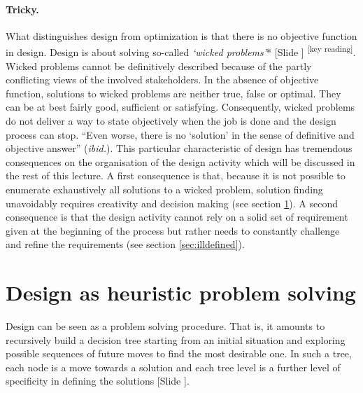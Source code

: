 \documentclass{article}
\newcounter{slide}
\begin{document}
\paragraph{Tricky.} What distinguishes design from optimization is that there is no objective function in design. Design is about solving so-called \emph{`wicked problems'}* {\color{blue}[Slide ]} \cite{rittelDilemmasGeneralTheory1973}\textsuperscript{\color{Magenta}[key reading]}. Wicked problems cannot be definitively described because of the partly conflicting views of the involved stakeholders. In the absence of objective function, solutions to wicked problems are neither true, false or optimal. They can be at best fairly good, sufficient or satisfying. Consequently, wicked problems do not deliver a way to state objectively when the job is done and the design process can stop. ``Even worse, there is no `solution' in the sense of definitive and objective answer'' (\emph{ibid.}). This particular characteristic of design has tremendous consequences on the organisation of the design activity which will be discussed in the rest of this lecture. A first consequence is that, because it is not possible to enumerate exhaustively all solutions to a wicked problem, solution finding unavoidably requires creativity {\color{red}{combine heuristics to find solutions}} and decision making {\color{red}{in the sense of arbitrarily cutting the unmanageable expansion of the decision tree and priorising a way to go}} (see section \ref{sec:GeneralProblemSolving}). A second consequence is that the design activity cannot rely on a solid set of requirement given at the beginning of the process but rather needs to constantly challenge and refine the requirements (see section \ref{sec:illdefined}). 

\section{Design as heuristic problem solving}
\label{sec:GeneralProblemSolving}
Design can be seen as a problem solving procedure. That is, it amounts to recursively build a decision tree starting from an initial situation and exploring possible sequences of future moves to find the most desirable one. In such a tree, each node is a move towards a solution and each tree level is a further level of specificity in defining the solutions {\color{blue}[Slide ]}. 
\end{document}
